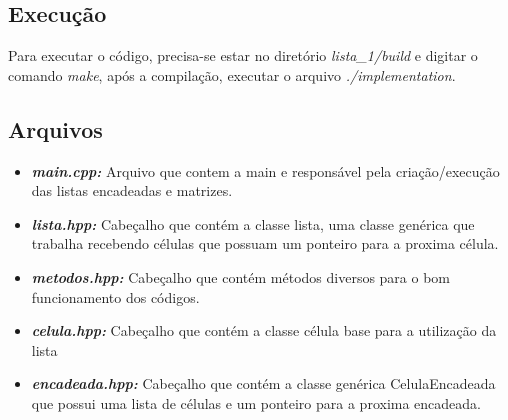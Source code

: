 \documentclass[12pt]{article}
\begin{document}
\subsection{Execução}
Para executar o código, precisa-se estar no diretório \textit{lista\_1/build} e digitar o comando \textit{make}, após a compilação, executar o arquivo \textit{./implementation}.

\subsection{Arquivos}
\begin{itemize}
    \item \textbf{\textit{main.cpp:}}
    Arquivo que contem a main e responsável pela criação/execução das listas encadeadas e matrizes.
    \item \textbf{\textit{lista.hpp:}}
    Cabeçalho que contém a classe lista, uma classe genérica que trabalha recebendo células que possuam um ponteiro para a proxima célula.
    \item \textbf{\textit{metodos.hpp:}}
    Cabeçalho que contém métodos diversos para o bom funcionamento dos códigos.
    \item \textbf{\textit{celula.hpp:}}
    Cabeçalho que contém a classe célula base para a utilização da lista
    \item \textbf{\textit{encadeada.hpp:}}
    Cabeçalho que contém a classe genérica CelulaEncadeada que possui uma lista de células e um ponteiro para a proxima encadeada.
\end{itemize}
\end{document}
